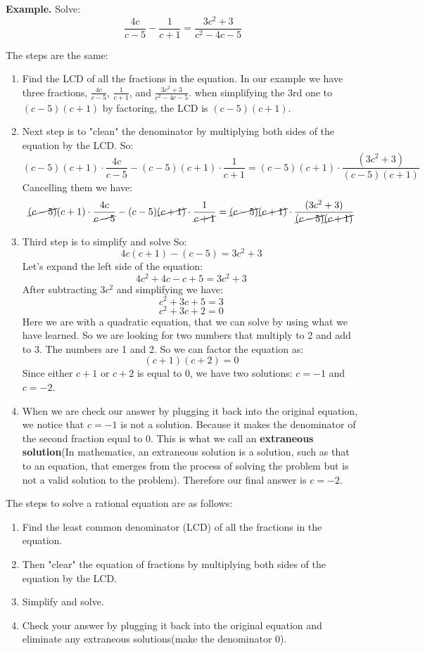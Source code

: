 \textbf{Example.} Solve: 
\begin{equation*}
    \frac{4c}{c-5} - \frac{1}{c+1} = \frac{3c^2+3}{c^2-4c-5}
\end{equation*}

The steps are the same: 
\begin{enumerate}
    \item Find the LCD of all the fractions in the equation. In our example we have three fractions, $\displaystyle \frac{4c}{c-5}$, $\displaystyle  \frac{1}{c+1}$, and $\displaystyle \frac{3c^2+3}{c^2-4c-5}$. when simplifying the 3rd one to $(c-5)(c+1)$ by factoring, the LCD is $(c-5)(c+1)$.
    \item Next step is to "clean" the denominator  by multiplying both sides of the equation by the LCD. So:
    $$ (c-5)(c+1) \cdot \frac{4c}{c-5} - (c-5)(c+1) \cdot \frac{1}{c+1} = (c-5)(c+1) \cdot \frac{(3c^2+3)}{(c-5)(c+1)}$$
    Cancelling them we have:
    $$ \cancel{(c-5)}(c+1) \cdot \frac{4c}{\cancel{c-5}} - (c-5)\cancel{(c+1)} \cdot \frac{1}{\cancel{c+1}} = \cancel{(c-5)}\cancel{(c+1)} \cdot \frac{(3c^2+3)}{\cancel{(c-5)}\cancel{(c+1)}}$$
    \item Third step is to simplify and solve So: 
    $$ 4c(c+1) - (c-5) = 3c^2+3$$
    Let's expand the left side of the equation:
    $$ 4c^2+4c - c + 5 = 3c^2+3$$
    After subtracting $3c^2$ and simplifying we have:
    $$ c^2+3c+5 = 3$$
    $$ c^2+3c+2 = 0$$
    Here we are with a quadratic equation, that we can solve by using what we have learned. 
    So we are looking for two numbers that multiply to 2 and add to 3. The numbers are 1 and 2. So we can factor the equation as:
    $$ (c+1)(c+2) = 0$$
    Since either $c+1$ or $c+2$ is equal to 0, we have two solutions: $c = -1$ and $c = -2$.
    \item When we are check our answer by plugging it back into the original equation, we notice that $c=-1$ is not a solution. Because it makes the denominator of the second fraction equal to 0. This is what we call an \textbf{extraneous solution}(In mathematics, an extraneous solution is a solution, such as that to an equation, that emerges from the process of solving the problem but is not a valid solution to the problem).
    Therefore our final answer is $c = -2$.
\end{enumerate}
The steps to solve a rational equation are as follows:
\begin{enumerate}
    \item Find the least common denominator (LCD) of all the fractions in the equation. 
    \item Then "clear" the equation of fractions by multiplying both sides of the equation by the LCD.
    \item  Simplify and solve.
    \item Check your answer by plugging it back into the original equation and eliminate any extraneous solutions(make the denominator 0).
\end{enumerate}